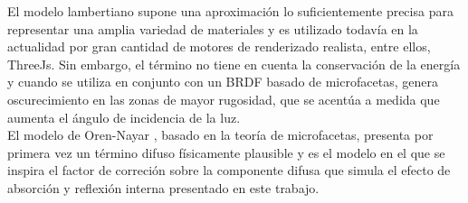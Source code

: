             El modelo lambertiano supone una aproximaci\'on lo suficientemente precisa para representar una amplia variedad de
            materiales y es utilizado todav\'ia en la actualidad por gran cantidad de motores de renderizado realista, entre ellos,
            ThreeJs. Sin embargo, el t\'ermino no tiene en cuenta la conservaci\'on de la energ\'ia y
            cuando se utiliza en conjunto con un BRDF basado de microfacetas, genera oscurecimiento en las zonas de mayor rugosidad,
            que se acent\'ua a medida que aumenta el \'angulo de incidencia de la luz.\\
            
            El modelo de Oren-Nayar \autocite{orennayar}, basado en la teor\'ia de microfacetas, presenta por primera vez un t\'ermino
            difuso f\'isicamente plausible y es el modelo en el que se inspira el factor de correci\'on sobre la componente difusa que
            simula el efecto de absorci\'on y reflexi\'on interna presentado en este trabajo.\\



